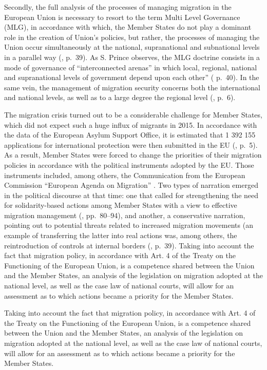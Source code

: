 \documentclass[10pt,a4paper]{article}
\begin{document}
\begin{multicols}{2}
Secondly, the full analysis of the processes of managing migration in the European Union is necessary to resort to the term Multi Level Governance (MLG), in accordance with which, the Member States do not play a dominant role in the creation of Union's policies, but rather, the processes of managing the Union occur simultaneously at the national, supranational and subnational levels in a parallel way (\citep{R5}, p.~39). As S. Prince observes, the MLG doctrine consists in a mode of governance of ``interconnected arenas'' in which local, regional, national and supranational levels of government depend upon each other'' (\citep{R5} p.~40). In the same vein, the management of migration security concerns both the international and national levels, as well as to a large degree the regional level (\citep{R6}, p.~6).

The migration crisis turned out to be a considerable challenge for Member States, which did not expect such a huge influx of migrants in 2015. In accordance with the data of the European Asylum Support Office, it is estimated that 1 392 155 applications for international protection were then submitted in the EU (\citep{R7}, p.~5). As a result, Member States were forced to change the priorities of their migration policies in accordance with the political instruments adopted by the EU. Those instruments included, among others, the Communication from the European Commission ``European Agenda on Migration'' \citep{R8}. Two types of narration emerged in the political discourse at that time: one that called for strengthening the need for solidarity-based actions among Member States with a view to effective migration management (\citep{R9}, pp.~80--94), and another, a conservative narration, pointing out to potential threats related to increased migration movements (an example of transferring the latter into real actions was, among others, the reintroduction of controls at internal borders (\cite{R10}, p.~39). Taking into account the fact that migration policy, in accordance with Art. 4 of the Treaty on the Functioning of the European Union, is a competence shared between the Union and the Member States, an analysis of the legislation on migration adopted at the national level, as well as the case law of national courts, will allow for an assessment as to which actions became a priority for the Member States.

Taking into account the fact that migration policy, in accordance with Art. 4 of the Treaty on the Functioning of the European Union, is a competence shared between the Union and the Member States, an analysis of the legislation on migration adopted at the national level, as well as the case law of national courts, will allow for an assessment as to which actions became a priority for the Member States.


\end{multicols}
\end{document}
